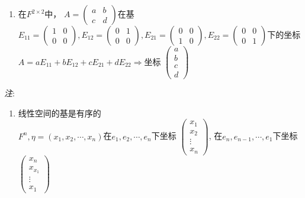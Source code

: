 \begin{property}[线性空间的性质]
\begin{example}
\begin{enumerate}
            \item 在$F^{2 \times 2}$中，
            $A = \left(\begin{array}{ccc}
                a & b \\
                c & d
            \end{array}\right)$在基
            $E_{11} = \left(\begin{array}{ccc}
                1 & 0 \\
                0 & 0
            \end{array}\right),
            E_{12} = \left(\begin{array}{ccc}
                0 & 1\\
                0 & 0
            \end{array}\right),
            E_{21} = \left(\begin{array}{ccc}
                0 & 0\\
                1 & 0
            \end{array}\right),
            E_22 = \left(\begin{array}{ccc}
                0 & 0\\
                0 & 1
            \end{array}\right)$下的坐标\\
            $A = aE_{11} + bE_{12} + cE_{21} + dE_{22} \Rightarrow$坐标
            $\left(\begin{array}{ccc}
                a\\
                b\\
                c\\
                d
            \end{array}\right)$
        \end{enumerate}
    \end{example}

    \emph{注}:
    \begin{enumerate}
        \item 线性空间的基是有序的\\
        $F^n, \eta = (x_1, x_2, \cdots, x_n)$在$e_1, e_2, \cdots, e_n$下坐标
        $\left(\begin{array}{ccc}
            x_1 \\
            x_2 \\
            \vdots \\
            x_n
        \end{array}\right)$,
        在$e_n, e_{n-1}, \cdots, e_1$下坐标
        $\left(\begin{array}{ccc}
            x_n \\
            x_{x_1} \\
            \vdots \\
            x_1
        \end{array}\right)$


\end{enumerate}
\end{property}
